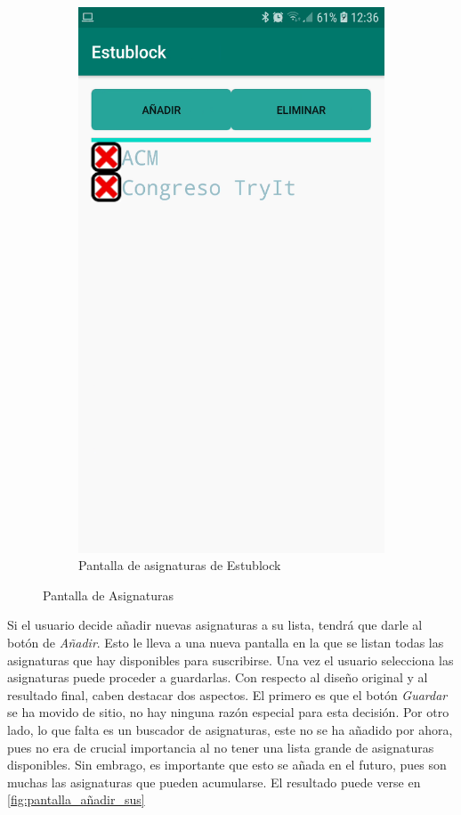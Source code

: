 \begin{figure}[hbt]
\begin{subfigure}[b]{0.4\linewidth}
        \includegraphics[width=0.7\linewidth]{figs/Desarrollo/Interfaz/estublock_asignaturas_suscritas}
        \caption[Estublock Asignaturas]{Pantalla de asignaturas de Estublock}
	\end{subfigure} 
	\caption[Pantalla de Asignaturas]{Pantalla de Asignaturas}
	\label{fig:pantalla_asignaturas}
\end{figure}

Si el usuario decide añadir nuevas asignaturas a su lista, tendrá que darle al botón de \textit{Añadir}. Esto le lleva a una nueva pantalla en la que se listan todas las asignaturas que hay disponibles para suscribirse. Una vez el usuario selecciona las asignaturas puede proceder a guardarlas. Con respecto al diseño original y al resultado final, caben destacar dos aspectos. El primero es que el botón \textit{Guardar} se ha movido de sitio, no hay ninguna razón especial para esta decisión. Por otro lado, lo que falta es un buscador de asignaturas, este no se ha añadido por ahora, pues no era de crucial importancia al no tener una lista grande de asignaturas disponibles. Sin embrago, es importante que esto se añada en el futuro, pues son muchas las asignaturas que pueden acumularse. El resultado puede verse en \ref{fig:pantalla_añadir_sus}

